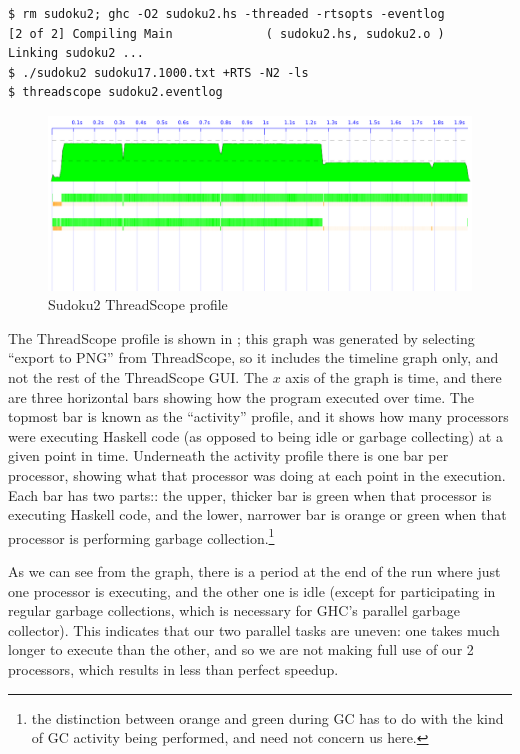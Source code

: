{\small \begin{verbatim}
$ rm sudoku2; ghc -O2 sudoku2.hs -threaded -rtsopts -eventlog
[2 of 2] Compiling Main             ( sudoku2.hs, sudoku2.o )
Linking sudoku2 ...
$ ./sudoku2 sudoku17.1000.txt +RTS -N2 -ls
$ threadscope sudoku2.eventlog
\end{verbatim}}

\begin{figure}
\begin{center}
\includegraphics[scale=0.4]{sudoku2.png}
\end{center}
\caption{Sudoku2 ThreadScope profile}
\label{fig:sudoku2-threadscope}
\end{figure}

The ThreadScope profile is shown in ; this
graph was generated by selecting ``export to PNG'' from ThreadScope,
so it includes the timeline graph only, and not the rest of the
ThreadScope GUI.  The $x$ axis of the graph is time, and there are
three horizontal bars showing how the program executed over time.  The
topmost bar is known as the ``activity'' profile, and it shows how
many processors were executing Haskell code (as opposed to being idle
or garbage collecting) at a given point in time.  Underneath the
activity profile there is one bar per processor, showing what that
processor was doing at each point in the execution.  Each bar has two
parts:: the upper, thicker bar is green when that processor is
executing Haskell code, and the lower, narrower bar is orange or green
when that processor is performing garbage collection.\footnote{the
  distinction between orange and green during GC has to do with the
  kind of GC activity being performed, and need not concern us here.}

As we can see from the graph, there is a period at the end of the run
where just one processor is executing, and the other one is idle
(except for participating in regular garbage collections, which is
necessary for GHC's parallel garbage collector).  This indicates that
our two parallel tasks are uneven: one takes much longer to execute
than the other, and so we are not making full use of our 2 processors,
which results in less than perfect speedup.

